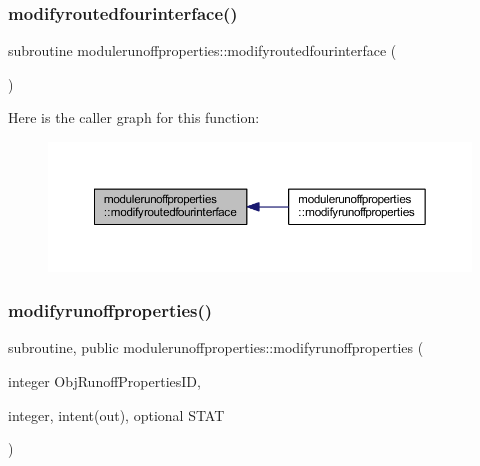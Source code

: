 \subsubsection{\texorpdfstring{modifyroutedfourinterface()}{modifyroutedfourinterface()}}
{\footnotesize\ttfamily subroutine modulerunoffproperties\+::modifyroutedfourinterface (\begin{DoxyParamCaption}{ }\end{DoxyParamCaption})\hspace{0.3cm}{\ttfamily [private]}}

Here is the caller graph for this function\+:\nopagebreak
\begin{figure}[H]
\begin{center}
\leavevmode
\includegraphics[width=350pt]{namespacemodulerunoffproperties_ac6419261cb4a595997e6f2b480bd1b27_icgraph}
\end{center}
\end{figure}
\mbox{\label{namespacemodulerunoffproperties_a3d6f36b2dc50b19f17e60e0778172343}} 
\subsubsection{\texorpdfstring{modifyrunoffproperties()}{modifyrunoffproperties()}}
{\footnotesize\ttfamily subroutine, public modulerunoffproperties\+::modifyrunoffproperties (\begin{DoxyParamCaption}\item[{integer}]{Obj\+Runoff\+Properties\+ID,  }\item[{integer, intent(out), optional}]{S\+T\+AT }\end{DoxyParamCaption})}

